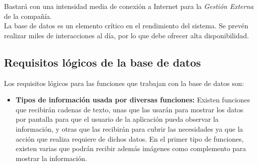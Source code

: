 \documentclass[11pt, a4paper, twoside, titlepage]{article}
\begin{document}
			Bastará con una intensidad media de conexión a Internet para la \textit{Gestión Externa} de la compañía.\\

			La base de datos es un elemento crítico en el rendimiento del sistema. Se prevén realizar miles de interacciones al día, por lo que debe ofrecer alta disponibilidad.

		\subsection{Requisitos lógicos de la base de datos}
			Los requisitos lógicos para las funciones que trabajan con la base de datos son:
			\begin{itemize}
				\item \textbf{Tipos de información usada por diversas funciones: }
				Existen funciones que recibirán cadenas de texto, unas que las usarán para mostrar los datos por pantalla para que el usuario de la aplicación pueda observar la información, y otras que las recibirán para cubrir las necesidades ya que la acción que realiza requiere de dichos datos. En el primer tipo de funciones, existen varias que podrán recibir además imágenes como complemento para mostrar la información. \\ 
				

\end{itemize}
\end{document}
